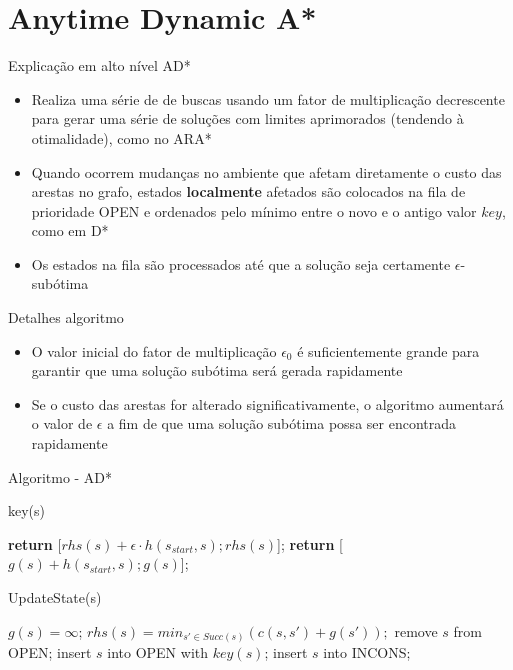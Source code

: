 \documentclass[10pt]{beamer}
\begin{document}
\section{Anytime Dynamic A*}
\begin{frame}{Explicação em alto nível AD*}
\begin{itemize}
\item Realiza uma série de de buscas usando um fator de multiplicação decrescente para gerar uma série de soluções com limites aprimorados (tendendo à otimalidade), como no \alert{ARA*}
\vspace{0.5cm}
\item Quando ocorrem mudanças no ambiente que afetam diretamente o custo das arestas no grafo, estados \textbf{localmente} afetados são colocados na fila de prioridade OPEN e ordenados pelo mínimo entre o novo e o antigo valor $key$, como em \alert{D*}
\vspace{0.5cm}
\item Os estados na fila são processados até que a solução seja certamente $\epsilon$-subótima
\end{itemize}
\end{frame}

\begin{frame}{Detalhes algoritmo}
\begin{itemize}
\item O valor inicial do fator de multiplicação $\epsilon_0$ é suficientemente grande para garantir que uma solução subótima será gerada rapidamente
\vspace{1cm}
\item Se o custo das arestas for alterado significativamente, o algoritmo aumentará o valor de $\epsilon$ a fim de que uma solução subótima possa ser encontrada rapidamente 
\end{itemize}
\end{frame}

\begin{frame}{Algoritmo - AD*}
\begin{algorithm}[H]
\caption{key(s)}
\begin{algorithmic}[1]
\State \textbf{return} [$rhs(s) + \epsilon \cdot h(s_{start}, s); rhs(s)$];
\Else
\State \textbf{return} [$g(s) + h(s_{start}, s); g(s)$];
\EndIf
\end{algorithmic}
\end{algorithm}
\begin{algorithm}[H]
\caption{UpdateState(s)}
\begin{algorithmic}[1]
    \State $g(s) = \infty$;
\EndIf
{} $rhs(s)=min_{s' \in Succ(s)}(c(s,s') + g(s'));$
\EndIf
{} remove $s$ from OPEN;
\EndIf
{} 
    \State insert $s$ into OPEN with $key(s)$;
    \Else
    \State insert $s$ into INCONS;
    \EndIf
\EndIf
\end{algorithmic}
\end{algorithm}
\end{frame}
\end{document}
